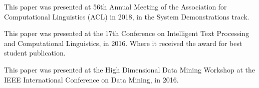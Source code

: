 \documentclass{book}
\begin{document}
\begin{preamble}
	This paper was presented at 56th Annual Meeting of the Association for Computational Linguistics (ACL) in 2018, in the System Demonstrations track.
\end{preamble}


\begin{preamble}
	This paper was presented at the 17th Conference on Intelligent Text Processing and Computational Linguistics, in 2016.
	Where it received the award for best student publication.
\end{preamble}

\begin{preamble}
	This paper was presented at the High Dimensional Data Mining Workshop at the IEEE International Conference on Data Mining, in 2016.
\end{preamble}

\end{document}
